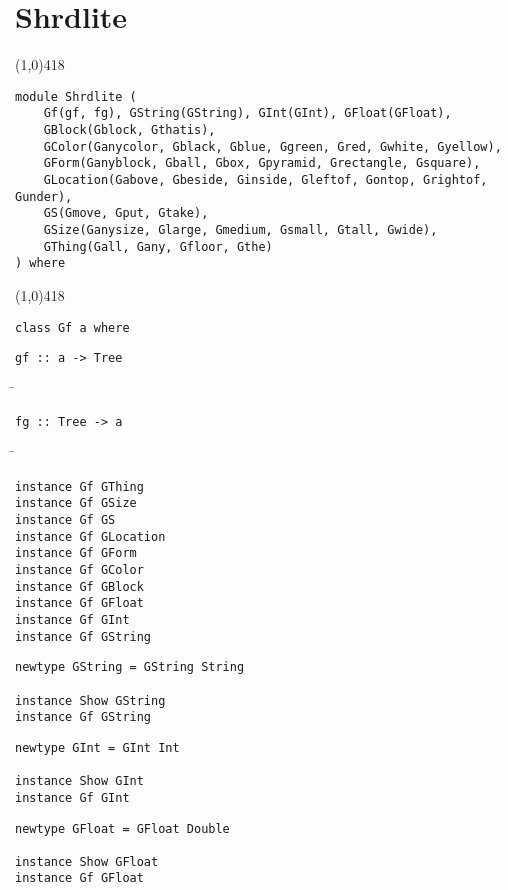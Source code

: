 \section{Shrdlite}
\begin{center}
\line(1,0){418}
\end{center}
\begin{verbatim}
module Shrdlite (
    Gf(gf, fg), GString(GString), GInt(GInt), GFloat(GFloat),
    GBlock(Gblock, Gthatis),
    GColor(Ganycolor, Gblack, Gblue, Ggreen, Gred, Gwhite, Gyellow),
    GForm(Ganyblock, Gball, Gbox, Gpyramid, Grectangle, Gsquare),
    GLocation(Gabove, Gbeside, Ginside, Gleftof, Gontop, Grightof, Gunder),
    GS(Gmove, Gput, Gtake),
    GSize(Ganysize, Glarge, Gmedium, Gsmall, Gtall, Gwide),
    GThing(Gall, Gany, Gfloor, Gthe)
) where
\end{verbatim}
\begin{center}
\line(1,0){418}
\end{center}
\begin{verbatim}
class Gf a where
\end{verbatim}
\begin{verbatim}
gf :: a -> Tree
\end{verbatim}
\begin{tabbing}
\hspace*{1cm}\= \kill
\> 
\end{tabbing}
\begin{verbatim}
fg :: Tree -> a
\end{verbatim}
\begin{tabbing}
\hspace*{1cm}\= \kill
\> 
\end{tabbing}
\begin{verbatim}
instance Gf GThing
instance Gf GSize
instance Gf GS
instance Gf GLocation
instance Gf GForm
instance Gf GColor
instance Gf GBlock
instance Gf GFloat
instance Gf GInt
instance Gf GString
\end{verbatim}
\begin{verbatim}
newtype GString = GString String

instance Show GString
instance Gf GString
\end{verbatim}
\begin{verbatim}
newtype GInt = GInt Int

instance Show GInt
instance Gf GInt
\end{verbatim}
\begin{verbatim}
newtype GFloat = GFloat Double

instance Show GFloat
instance Gf GFloat
\end{verbatim}
